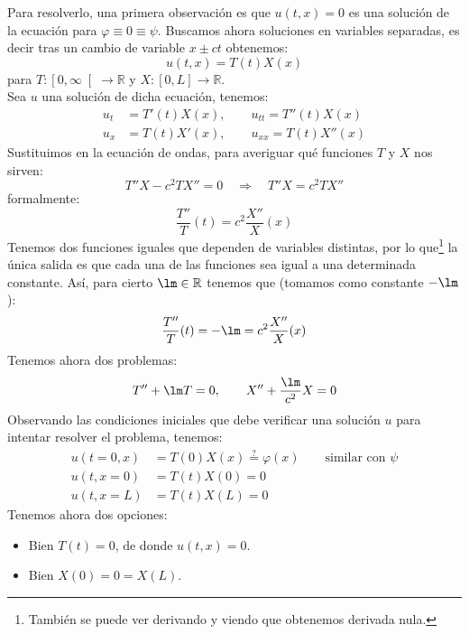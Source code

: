 \noindent
Para resolverlo, una primera observación es que $u(t,x) = 0$ es una solución de la ecuación para $\varphi\equiv 0\equiv \psi$. Buscamos ahora soluciones en variables separadas, es decir tras un cambio de variable $x\pm ct$ obtenemos:
\begin{equation*}
    u(t,x) = T(t)X(x)
\end{equation*}
para $T:\left[0,\infty\right[\to \mathbb{R}$ y $X:[0,L]\to \mathbb{R}$.\\

\noindent
Sea $u$ una solución de dicha ecuación, tenemos:
\begin{align*}
    u_t &= T'(t) X(x), \qquad u_{tt} = T''(t)X(x) \\
    u_x &= T(t) X'(x), \qquad u_{xx} = T(t)X''(x)
\end{align*}
Sustituimos en la ecuación de ondas, para averiguar qué funciones $T$ y $X$ nos sirven: 
\begin{equation*}
    T''X - c^2 TX'' = 0 \quad\Longrightarrow\quad T''X = c^2 TX''
\end{equation*}
formalmente:
\begin{equation*}
    \frac{T''}{T}(t) = c^2 \frac{X''}{X}(x)
\end{equation*}
Tenemos dos funciones iguales que dependen de variables distintas, por lo que\footnote{También se puede ver derivando y viendo que obtenemos derivada nula.} la única salida es que cada una de las funciones sea igual a una determinada constante. Así, para cierto $\lm \in \mathbb{R}$ tenemos que (tomamos como constante $-\lm$):
\begin{equation*}
    \frac{T''}{T}(t) = -\lm = c^2 \frac{X''}{X}(x)
\end{equation*}
Tenemos ahora dos problemas:
\begin{equation*}
    T'' + \lm T = 0, \qquad X'' + \frac{\lm}{c^2} X = 0
\end{equation*}
Observando las condiciones iniciales que debe verificar una solución $u$ para intentar resolver el problema, tenemos:
\begin{align*}
    u(t=0,x) &= T(0)X(x) \stackrel{?}{=} \varphi(x) \qquad \text{similar con\ } \psi \\
    u(t,x=0) &= T(t)X(0) = 0 \\
    u(t,x=L) &= T(t)X(L) = 0
\end{align*}
Tenemos ahora dos opciones:
\begin{itemize}
    \item Bien $T(t) = 0$, de donde $u(t,x) = 0$.
    \item Bien $X(0) = 0 = X(L)$.
\end{itemize}
